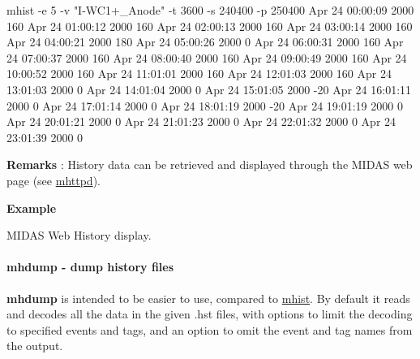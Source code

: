 \begin{DoxyCode}
   mhist -e 5 -v "I-WC1+_Anode" -t 3600 -s 240400 -p 250400
  Apr 24 00:00:09 2000    160
  Apr 24 01:00:12 2000    160
  Apr 24 02:00:13 2000    160
  Apr 24 03:00:14 2000    160
  Apr 24 04:00:21 2000    180
  Apr 24 05:00:26 2000    0
  Apr 24 06:00:31 2000    160
  Apr 24 07:00:37 2000    160
  Apr 24 08:00:40 2000    160
  Apr 24 09:00:49 2000    160
  Apr 24 10:00:52 2000    160
  Apr 24 11:01:01 2000    160
  Apr 24 12:01:03 2000    160
  Apr 24 13:01:03 2000    0
  Apr 24 14:01:04 2000    0
  Apr 24 15:01:05 2000    -20
  Apr 24 16:01:11 2000    0
  Apr 24 17:01:14 2000    0
  Apr 24 18:01:19 2000    -20
  Apr 24 19:01:19 2000    0
  Apr 24 20:01:21 2000    0
  Apr 24 21:01:23 2000    0
  Apr 24 22:01:32 2000    0
  Apr 24 23:01:39 2000    0
\end{DoxyCode}

\begin{DoxyItemize}
\item {\bfseries  Remarks }: History data can be retrieved and displayed through the MIDAS web page (see \hyperlink{RC_mhttpd_utility}{mhttpd}).
\end{DoxyItemize}


\begin{DoxyItemize}
\item {\bfseries  Example } \begin{center}  MIDAS Web History display.  \end{center} 
\end{DoxyItemize}





\label{F_History_logging_idx_mhdump-utility}
\hypertarget{F_History_logging_idx_mhdump-utility}{}
 \label{F_History_logging_idx_history_dump-files}
\hypertarget{F_History_logging_idx_history_dump-files}{}
 \hypertarget{F_History_logging_F_mhdump_utility}{}\paragraph{mhdump -\/ dump history files}\label{F_History_logging_F_mhdump_utility}
{\bfseries mhdump} is intended to be easier to use, compared to \hyperlink{F_History_logging_F_mhist_utility}{mhist}. By default it reads and decodes all the data in the given .hst files, with options to limit the decoding to specified events and tags, and an option to omit the event and tag names from the output.

